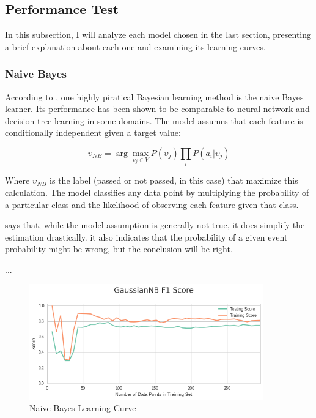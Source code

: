 \documentclass[a4paper]{article}
\begin{document}
\subsection{Performance Test}

In this subsection, I will analyze each model chosen in the last section, presenting a brief explanation about each one and examining its learning curves.

\subsubsection{Naive Bayes}
According to \cite{Mitchell}, one highly piratical Bayesian learning method is the naive Bayes learner. Its performance has been shown to be comparable to neural network and decision tree learning in some domains. The model assumes that each feature is conditionally independent given a target value:

$$\upsilon_{NB} = \arg\max_{v_j \in V}P(\upsilon_j) \prod_i P(a_i | \upsilon_j) $$

Where $\upsilon_{NB}$ is the label (passed or not passed, in this case) that maximize this calculation. The model classifies any data point by multiplying the probability of a particular class and the likelihood of observing each feature given that class.

\cite{Hastie_2009} says that, while the model assumption is generally not true, it does simplify the estimation drastically. it also indicates that the probability of a given event probability might be wrong, but the conclusion will be right.

...

\begin{figure}[ht!]
\centering
\includegraphics[width=0.9\textwidth]{figures/guassianNB.png}
\caption{\label{fig:gaussianNB}Naive Bayes Learning Curve}
\end{figure}
\end{document}
